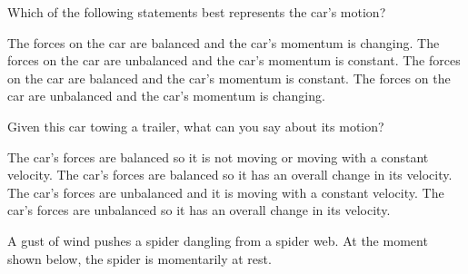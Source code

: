 \documentclass[]{exam}
\begin{document}
\begin{questions}
Which of the following statements best represents the car’s motion?

\begin{randomizechoices}[norandomize]
    \choice The forces on the car are balanced and the car’s momentum is changing.			
    \choice The forces on the car are unbalanced and the car’s momentum is constant.
    \choice The forces on the car are balanced and the car’s momentum is constant.
    \correctchoice The forces on the car are unbalanced and the car’s momentum is changing.
\end{randomizechoices}

\ifprintanswers
\else
\clearpage
\fi

\question
Given this car towing a trailer, what can you say about its motion?

\begin{center}
\end{center}

\begin{randomizechoices}[norandomize]
    \choice The car’s forces are balanced so it is not moving or moving with a constant velocity.
    \choice The car’s forces are balanced so it has an overall change in its velocity.
    \choice The car’s forces are unbalanced and it is moving with a constant velocity.
    \correctchoice The car’s forces are unbalanced so it has an overall change in its velocity.    
\end{randomizechoices}

\question
A gust of wind pushes a spider dangling from a spider web. At the moment shown below, the spider is momentarily at rest.

\begin{center}
\end{center}


\end{questions}
\end{document}
